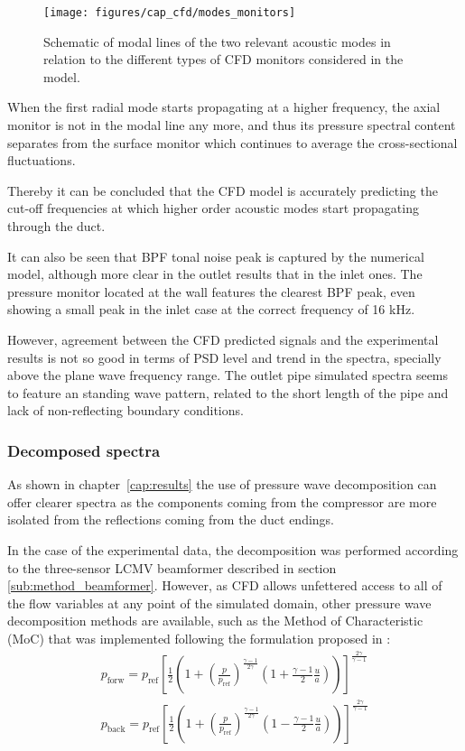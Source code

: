 \begin{figure}[htb!]
\centering
\texttt{[image: figures/cap\_cfd/modes\_monitors]}
\caption{Schematic of modal lines of the two relevant acoustic modes in relation to the different types of CFD monitors considered in the model.}
\label{fig:cfd_modes_monitors}
\end{figure}

When the first radial mode starts propagating at a higher frequency, the axial monitor is not in the modal line any more, and thus its pressure spectral content separates from the surface monitor which continues to average the cross-sectional fluctuations.

Thereby it can be concluded that the CFD model is accurately predicting the cut-off frequencies at which higher order acoustic modes start propagating through the duct.

It can also be seen that BPF tonal noise peak is captured by the numerical model, although more clear in the outlet results that in the inlet ones. The pressure monitor located at the wall features the clearest BPF peak, even showing a small peak in the inlet case at the correct frequency of 16 kHz.

However, agreement between the CFD predicted signals and the experimental results is not so good in terms of PSD level and trend in the spectra, specially above the plane wave frequency range. The outlet pipe simulated spectra seems to feature an standing wave pattern, related to the short length of the pipe and lack of non-reflecting boundary conditions.

\subsubsection{Decomposed spectra}

As shown in chapter~\ref{cap:results} the use of pressure wave decomposition can offer clearer spectra as the components coming from the compressor are more isolated from the reflections coming from the duct endings. 

In the case of the experimental data, the decomposition was performed according to the three-sensor LCMV beamformer described in section \ref{sub:method_beamformer}. However, as CFD allows unfettered access to all of the flow variables at any point of the simulated domain, other pressure wave decomposition methods are available, such as the Method of Characteristic (MoC) that was implemented following the formulation proposed in \cite{payri1995acoustic,torregrosa2012dev,galindo2010coupling}: 
\begin{eqnarray}\label{eq:descomposicion}
p_\text{forw}=p_\text{ref}\left[ \frac{1}{2}\left(1+\left(\frac{p}{p_\text{ref}}\right)^{\frac{\gamma-1}{2\gamma}}\left(1+\frac{\gamma-1}{2}\frac{u}{a}\right)\right) \right]^{\frac{2\gamma}{\gamma-1}}\\
p_\text{back}=p_\text{ref}\left[ \frac{1}{2}\left(1+\left(\frac{p}{p_\text{ref}}\right)^{\frac{\gamma-1}{2\gamma}}\left(1-\frac{\gamma-1}{2}\frac{u}{a}\right)\right) \right]^{\frac{2\gamma}{\gamma-1}}\nonumber
\end{eqnarray}

